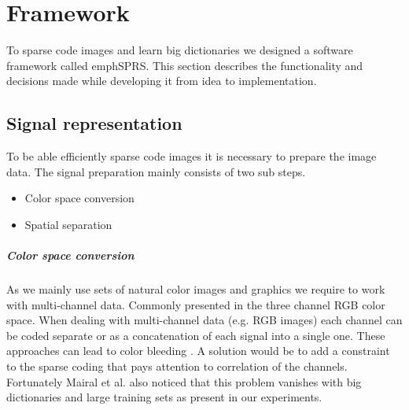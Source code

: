 
\chapter{Framework}
To sparse code images and learn big dictionaries we designed a software
framework called emph{SPRS}. This section describes the functionality and
decisions made while developing it from idea to implementation.

\section{Signal representation}
\label{sec:signal_representation}
To be able efficiently sparse code images it is necessary to prepare the
image data. The signal preparation mainly consists of two sub steps.
\begin{itemize}
 \item Color space conversion
 \item Spatial separation
\end{itemize}

\paragraph{Color space conversion} As we mainly use sets of natural color images
and graphics we require to work with multi-channel data. Commonly presented in
the three channel RGB color space.
When dealing with multi-channel data (e.g. RGB images) each channel can be coded
separate or as a concatenation of each signal into a single one. These
approaches can lead to color bleeding \cite{mairal08sparse}. 
A solution would be to add a constraint to the sparse coding that pays
attention to correlation of the channels.  
Fortunately Mairal et al. also noticed that this problem vanishes with big
dictionaries and large training sets as present in our experiments.
\cite{mairal08sparse}


